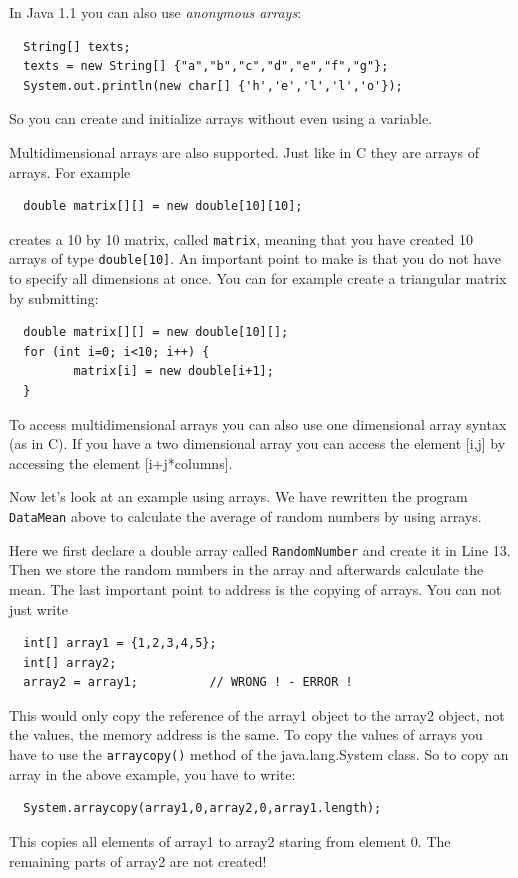 In Java 1.1 you can also use \emph{anonymous arrays}:
\begin{verbatim}
  String[] texts;
  texts = new String[] {"a","b","c","d","e","f","g"};
  System.out.println(new char[] {'h','e','l','l','o'});
\end{verbatim}
So you can create and initialize arrays without even using a variable.

Multidimensional arrays are also supported. Just like in C they are
arrays of arrays. For example
\begin{verbatim}
  double matrix[][] = new double[10][10]; 
\end{verbatim}
creates a 10 by 10 matrix, called \verb|matrix|, 
meaning that you have created 10 arrays
of type \verb|double[10]|. An important point to make is that you
do not have to specify all dimensions at once. You can for example
create a triangular matrix by submitting:
\begin{verbatim}
  double matrix[][] = new double[10][];
  for (int i=0; i<10; i++) {
         matrix[i] = new double[i+1];
  } 
\end{verbatim}
To access multidimensional arrays you can also use one dimensional
array syntax (as in C). If you have a two dimensional array 
you can access the element [i,j] by accessing the element [i+j*columns]. 

Now let's look at an example using arrays. We have rewritten the program
\verb|DataMean| above to calculate the average of random 
numbers by using arrays.


Here we first declare a double array called \verb|RandomNumber| and
create it in Line 13. Then we store the random numbers in the array
and afterwards calculate the mean.
The last important point to address is the copying of arrays. 
You can not just write
\begin{verbatim}
  int[] array1 = {1,2,3,4,5};
  int[] array2;
  array2 = array1;          // WRONG ! - ERROR ! 
\end{verbatim}
This would only copy the reference of the array1 object to the array2
object, not the values, the memory address is the same. 
To copy the values of arrays you have to use the 
\verb|arraycopy()| method of the java.lang.System class. 
So to copy an array in the above example, you have to write:
\begin{verbatim}
  System.arraycopy(array1,0,array2,0,array1.length);
\end{verbatim}
This copies all elements of array1 to array2 staring from element 0. 
The remaining parts of array2 are not created!

